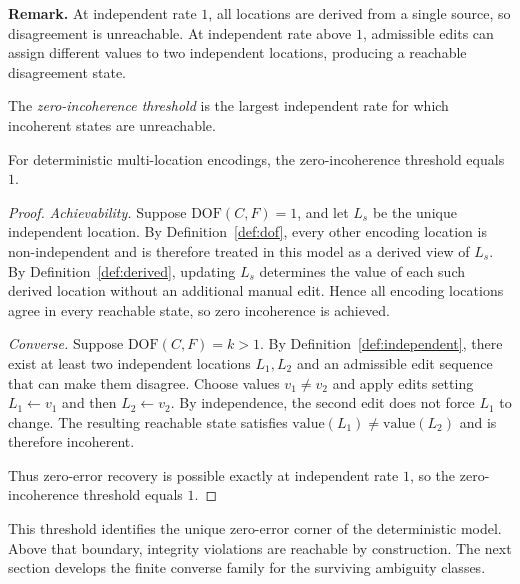 \medskip
\noindent\textbf{Remark.} At independent rate $1$, all locations are derived from a single source, so disagreement is unreachable. At independent rate above $1$, admissible edits can assign different values to two independent locations, producing a reachable disagreement state.

\begin{definition}\label{def:coherence-capacity}
The \emph{zero-incoherence threshold} is the largest independent rate for which incoherent states are unreachable.
\end{definition}

\begin{corollary}\label{thm:coherence-capacity}
For deterministic multi-location encodings, the zero-incoherence threshold equals $1$.
\end{corollary}

\begin{proof}
\emph{Achievability.} Suppose $\mathrm{DOF}(C,F)=1$, and let $L_s$ be the unique independent location. By Definition~\ref{def:dof}, every other encoding location is non-independent and is therefore treated in this model as a derived view of $L_s$. By Definition~\ref{def:derived}, updating $L_s$ determines the value of each such derived location without an additional manual edit. Hence all encoding locations agree in every reachable state, so zero incoherence is achieved.

\emph{Converse.} Suppose $\mathrm{DOF}(C,F)=k>1$. By Definition~\ref{def:independent}, there exist at least two independent locations $L_1,L_2$ and an admissible edit sequence that can make them disagree. Choose values $v_1\neq v_2$ and apply edits setting $L_1\leftarrow v_1$ and then $L_2\leftarrow v_2$. By independence, the second edit does not force $L_1$ to change. The resulting reachable state satisfies $\mathrm{value}(L_1)\neq \mathrm{value}(L_2)$ and is therefore incoherent.

Thus zero-error recovery is possible exactly at independent rate $1$, so the zero-incoherence threshold equals $1$.
\end{proof}

This threshold identifies the unique zero-error corner of the deterministic model. Above that boundary, integrity violations are reachable by construction. The next section develops the finite converse family for the surviving ambiguity classes.
